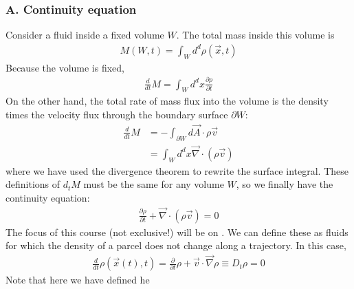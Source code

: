 \documentclass[letterpaper,10pt,english]{jupyterBook}
\begin{document}
\subsubsection{A. Continuity equation}
\label{\detokenize{chapter1/euler:a-continuity-equation}}
\sphinxAtStartPar
Consider a fluid inside a fixed volume \(W\). The total mass inside this volume
is
\begin{equation}\label{equation:chapter1/euler:mass_euler}
\begin{split}M(W,t) = \int_W d^d \rho({\vec x},t)\end{split}
\end{equation}
\sphinxAtStartPar
Because the volume is fixed,
\begin{equation}\label{equation:chapter1/euler:mass_change}
\begin{split}\frac{d}{dt} M = \int_W d^d x \frac{\partial \rho}{\partial t}\end{split}
\end{equation}
\sphinxAtStartPar
On the other hand, the total rate of mass flux into the volume is the
density times the velocity flux through the boundary
surface \({\partial W}\):
\label{equation:chapter1/euler:8f86be87-2320-4301-8c25-a32d0c36f6fb}\begin{align}
	\frac{d}{dt} M & =  - \int_{\partial W} d{\vec A}\cdot \rho {\vec v}\\
	& = \int_W d^d x {\vec \nabla} \cdot (\rho {\vec v})
\end{align}
\sphinxAtStartPar
where we have used the divergence theorem to rewrite the surface integral.
These definitions of \(d_t M\) must be the same for any volume \(W\), so we
finally have the continuity equation:
\begin{equation}\label{equation:chapter1/euler:continuity}
\begin{split}\frac{\partial \rho}{\partial t} + {\vec \nabla}\cdot (\rho {\vec v}) = 0\end{split}
\end{equation}
\sphinxAtStartPar
The focus of this course (not exclusive!) will be on  .
We can define these as fluids for which the density of a parcel does not
change along a trajectory. In this case,
\begin{equation}\label{equation:chapter1/euler:incomp}
\begin{split}\frac{d}{dt} \rho({\vec x}(t), t) = \frac{\partial}{\partial t} 
\rho + {\vec v}\cdot {\vec\nabla} \rho \equiv D_t \rho = 0\end{split}
\end{equation}
\sphinxAtStartPar
Note that here we have defined he 
\end{document}

